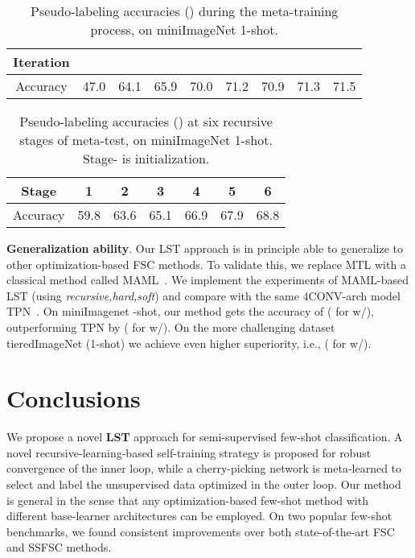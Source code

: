 \documentclass{article}
\newcommand{\myparagraph}[1]{\vspace{0.1em}\noindent\textbf{#1}}
\begin{document}
\begin{table*}[h]
\vspace{-3pt}
\footnotesize
\centering
\begin{tabular}{ccccccccc}
\toprule
Iteration &  &  &  &  &  &  &  & \\
\midrule[1pt]
Accuracy & 47.0 & 64.1 & 65.9 & 70.0 & 71.2 & 70.9 & 71.3 & 71.5 \\
\bottomrule[1pt]
\end{tabular}
\vspace{-0.15cm}
\caption{Pseudo-labeling accuracies () during the meta-training process, on miniImageNet 1-shot.}
\label{table_pl_train}
\end{table*} \begin{table*}[h]
\vspace{-5pt}
\footnotesize
\centering
\begin{tabular}{ccccccc}
\toprule
Stage & 1 & 2 & 3 & 4 & 5 & 6\\
\midrule[1pt]
Accuracy & 59.8 & 63.6 & 65.1 & 66.9 & 67.9 & 68.8 \\
\bottomrule[1pt]
\end{tabular}
\vspace{-0.15cm}
\caption{Pseudo-labeling accuracies () at six recursive stages of meta-test, on miniImageNet 1-shot. Stage- is initialization.}
\label{table_pl_test}
\end{table*} 

\myparagraph{Generalization ability}.
Our LST approach is in principle able to generalize to other optimization-based FSC methods. To validate this, we replace MTL with a classical method called MAML~\cite{FinnAL17}.
We implement the experiments of MAML-based LST (using \emph{recursive,hard,soft}) and compare with the same 4CONV-arch model TPN~\cite{LiuICLR2019transductive}. 
On miniImagenet -shot,
our method gets the accuracy of  ( for w/), outperforming TPN by   ( for w/).
On the more challenging dataset tieredImageNet (1-shot) we achieve even higher superiority, i.e.,  ( for w/). 
 
% 

\section{Conclusions}
We propose a novel \textbf{LST} approach for semi-supervised few-shot classification. A novel recursive-learning-based self-training strategy is proposed for robust convergence of the inner loop, while a cherry-picking network is meta-learned to select and label the unsupervised data optimized in the outer loop. 
Our method is general in the sense that any optimization-based few-shot method with different base-learner architectures can be employed. On two popular few-shot benchmarks, we found consistent improvements over both state-of-the-art FSC and SSFSC methods.
\end{document}
